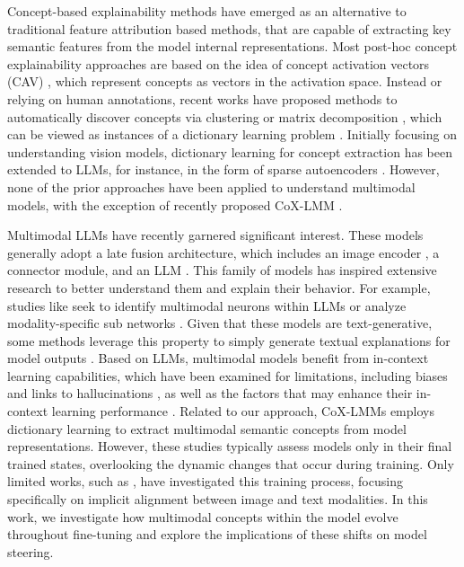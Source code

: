 Concept-based explainability methods have emerged as an alternative to traditional feature attribution based methods, that are capable of extracting key semantic features from the model internal representations. Most post-hoc concept explainability approaches are based on the idea of concept activation vectors (CAV) \cite{tcav}, which represent concepts as vectors in the activation space. Instead or relying on human annotations, recent works have proposed methods to automatically discover concepts via clustering \cite{ace, conceptshap} or matrix decomposition \cite{fel2023craft}, which can be viewed as instances of a dictionary learning problem \cite{fel2023holistic}. Initially focusing on understanding vision models, dictionary learning for concept extraction has been extended to LLMs, for instance, in the form of sparse autoencoders \cite{huben2023sparse, rajamanoharan2024improving}. However, none of the prior approaches have been applied to understand multimodal models, with the exception of recently proposed CoX-LMM \cite{parekh2024concept}. 


Multimodal LLMs \cite{liu2024improvedllava,bai2023qwenvl,laurenccon2024mattersidefics2,vallaeys2024improveddepalm} have recently garnered significant interest. These models generally adopt a late fusion architecture, which includes an image encoder \cite{clip,zhai2023sigmoidsiglip,fini2024multimodal}, a connector module, and an LLM \cite{touvron2023llamav2,jiang2023mistral,team2024gemma2}. This family of models has inspired extensive research to better understand them and explain their behavior. For example, studies like \cite{schwettmann2023multimodal,pan2023finding,huang2024miner} seek to identify multimodal neurons within LLMs or analyze modality-specific sub networks \cite{shukor2024implicit}. Given that these models are text-generative, some methods leverage this property to simply generate textual explanations for model outputs \cite{shukor2024beyond,xue2024fewshotmuliexp,ge2023wrongtoright,chen2022rex}. Based on LLMs, multimodal models benefit from in-context learning capabilities, which have been examined for limitations, including biases \cite{Baldassini_2024_CVPR} and links to hallucinations \cite{shukor2024beyond}, as well as the factors that may enhance their in-context learning performance \cite{chen2024understandingicl,qin2024factors}. Related to our approach, CoX-LMMs \cite{parekh2024concept} employs dictionary learning to extract multimodal semantic concepts from model representations. However, these studies typically assess models only in their final trained states, overlooking the dynamic changes that occur during training. Only limited works, such as \cite{shukor2024implicit}, have investigated this training process, focusing specifically on implicit alignment between image and text modalities. In this work, we investigate how multimodal concepts within the model evolve throughout fine-tuning and explore the implications of these shifts on model steering.

